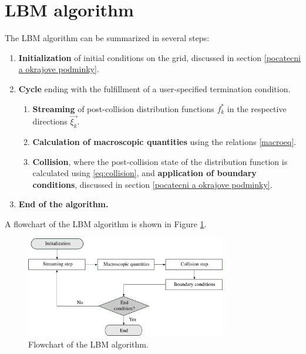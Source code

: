 \section{LBM algorithm}\label{algoritmus LBM}
The LBM algorithm can be summarized in several steps:
\begin{enumerate}
	\item \textbf{Initialization} of initial conditions on the grid, discussed in section \ref{pocatecni a okrajove podminky}.
	\item \textbf{Cycle} ending with the fulfillment of a user-specified termination condition.
	\begin{enumerate}
		\item \textbf{Streaming} of post-collision distribution functions \( f^{*}_{k} \) in the respective directions \( \vec{\xi_{k}} \).
		\item \textbf{Calculation of macroscopic quantities} using the relations \eqref{macroeq}.
		\item \textbf{Collision}, where the post-collision state of the distribution function is calculated using \eqref{eq:collision}, and \textbf{application of boundary conditions}, discussed in section \ref{pocatecni a okrajove podminky}.
	\end{enumerate}
	\item \textbf{End of the algorithm.}
\end{enumerate}
A flowchart of the LBM algorithm is shown in Figure \ref{fig:algo}.
\begin{figure}[h]
	\centering
	\includegraphics[width=0.78\textwidth]{figures/algo-bw.pdf}
	\caption{Flowchart of the LBM algorithm.}
	\label{fig:algo}
\end{figure}